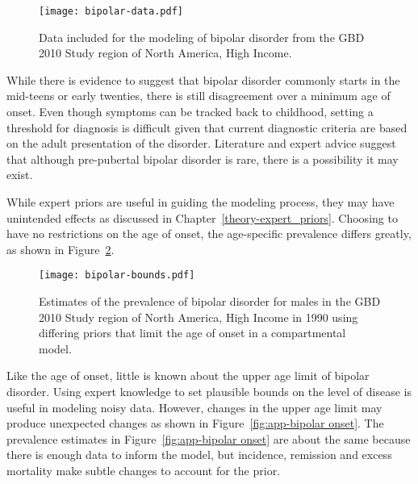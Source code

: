     \begin{figure}[h]
        \begin{center}
            \texttt{[image: bipolar-data.pdf]}
            \caption{Data included for the modeling of bipolar
              disorder from the GBD 2010 Study region of North America,
              High Income.}
            \label{fig:app-bipolar data}
        \end{center}
    \end{figure}

While there is evidence to suggest that bipolar disorder commonly
starts in the mid-teens or early twenties, there is still disagreement
over a minimum age of onset.  Even though symptoms can be tracked back
to childhood, setting a threshold for diagnosis is difficult given
that current diagnostic criteria are based on the adult presentation of
the disorder.  Literature and expert advice suggest that although
pre-pubertal bipolar disorder is rare, there is a possibility it may
exist. \cite{kloos_bipolar_2011, angst_historical_2000}

While expert priors are useful in guiding the modeling process, they
may have unintended effects as discussed in Chapter~\ref{theory-expert_priors}.
Choosing to have no restrictions on the
age of onset, the age-specific prevalence differs greatly, as shown in
Figure~\ref{fig:app-bipolar bounds}.

    \begin{figure}[h]
        \begin{center}
            \texttt{[image: bipolar-bounds.pdf]}
            \caption{Estimates of the prevalence of bipolar disorder
              for males in the GBD 2010 Study region of North America, High Income
              in 1990 using differing priors that limit the age of onset
              in a compartmental model.}
            \label{fig:app-bipolar bounds}
        \end{center}
    \end{figure}

Like the age of onset, little is known about the upper age limit of
bipolar disorder.  Using expert knowledge to set plausible bounds on the
level of disease is useful in modeling noisy data.  However, changes in the upper age
limit may produce unexpected changes as shown in Figure~\ref{fig:app-bipolar onset}.
The prevalence estimates in Figure~\ref{fig:app-bipolar onset} are about
the same because there is enough data to inform the model, but incidence,
remission and excess mortality make subtle changes to account for the prior.

